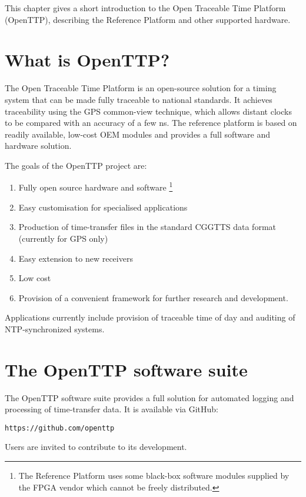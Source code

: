 


This chapter gives a short introduction to the Open Traceable Time Platform (OpenTTP), describing the Reference Platform and other supported hardware.

\section{What is OpenTTP?}

The Open Traceable Time Platform is an open-source solution for a timing system that can be made fully traceable to national standards.
It achieves traceability using the GPS common-view technique, which allows distant clocks to be compared with an accuracy of a few ns.
The reference platform is based on readily available, low-cost OEM modules and provides a full software and hardware solution. 

The goals of the OpenTTP project are:
\begin{enumerate}

	\item Fully open source hardware and software 
		\footnote{The Reference Platform uses some black-box software modules supplied by the FPGA vendor which cannot be freely distributed.}
	
	\item Easy customisation for specialised applications
	
	\item Production of time-transfer files in the standard CGGTTS data format 
		(currently for GPS only)
	
	\item Easy extension to new receivers

	\item Low cost
	
	\item Provision of a convenient framework for further research and development.

\end{enumerate}

Applications currently include provision of traceable time of day and auditing of NTP-synchronized systems.

\section{The OpenTTP software suite}

The OpenTTP software suite provides a full solution for automated logging and processing of time-transfer data.
It is available via GitHub:
\begin{lstlisting}
https://github.com/openttp
\end{lstlisting}
Users are invited to contribute to its development.

